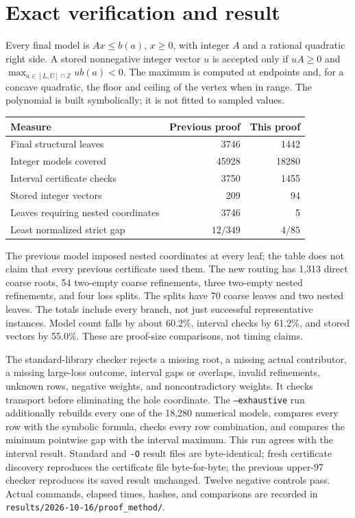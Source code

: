 \documentclass[11pt,a4paper]{article}
\begin{document}
\section{Exact verification and result}
Every final model is $Ax\le b(a)$, $x\ge0$, with integer $A$ and a
rational quadratic right side. A stored nonnegative integer vector $u$
is accepted only if $uA\ge0$ and
$\max_{a\in[L,U]\cap\mathbb Z}ub(a)<0$.
The maximum is computed at endpoints and, for a concave quadratic, the
floor and ceiling of the vertex when in range. The polynomial is built
symbolically; it is not fitted to sampled values.

\begin{center}\small
\begin{tabular}{lrr}
\toprule
Measure&Previous proof&This proof\\
\midrule
Final structural leaves&3746&1442\\
Integer models covered&45928&18280\\
Interval certificate checks&3750&1455\\
Stored integer vectors&209&94\\
Leaves requiring nested coordinates&3746&5\\
Least normalized strict gap&$12/349$&$4/85$\\
\bottomrule
\end{tabular}
\end{center}
The previous model imposed nested coordinates at every leaf; the table
does not claim that every previous certificate used them.
The new routing has 1,313 direct coarse roots, 54 two-empty coarse
refinements, three two-empty nested refinements, and four loss splits.
The splits have 70 coarse leaves and two nested leaves. The totals
include every branch, not just successful representative instances.
Model count falls by about 60.2\%, interval checks by 61.2\%, and stored
vectors by 55.0\%. These are proof-size comparisons, not timing claims.

The standard-library checker rejects a missing root, a missing actual
contributor, a missing large-loss outcome, interval gaps or overlaps,
invalid refinements, unknown rows, negative weights, and noncontradictory
weights. It checks transport before eliminating the hole coordinate.
The \texttt{--exhaustive} run additionally rebuilds every one of the
18,280 numerical models, compares every row with the symbolic formula,
checks every row combination, and compares the minimum pointwise gap
with the interval maximum. This run agrees with the interval result.
Standard and \texttt{-O} result files are byte-identical; fresh certificate
discovery reproduces the certificate file byte-for-byte; the previous
upper-97 checker reproduces its saved result unchanged. Twelve negative
controls pass. Actual commands, elapsed times, hashes, and comparisons
are recorded in \texttt{results/2026-10-16/proof\_method/}.
\end{document}
